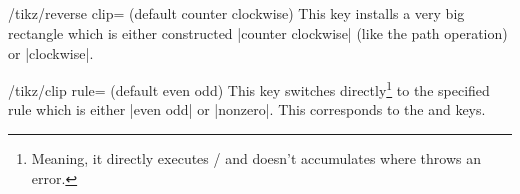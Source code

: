 \pagebreak
\subsection{\tikzname}
\begin{multicols}{2}
\begin{key}{/tikz/reverse clip= (default counter clockwise)}
This key installs a very big rectangle which is either constructed
|counter clockwise| (like the 
path operation) or |clockwise|.
\end{key}
\begin{key}{/tikz/clip rule= (default even odd)}
This key switches directly\footnote{%
  Meaning, it directly executes
  /%
  and doesn't accumulates where \tikzname\space
  throws an error.}
to the specified rule which is
either |even odd| or |nonzero|.
This corresponds to the  and
 keys.
\end{key}
\end{multicols}
\begin{codeexample}[preamble=\usetikzlibrary{ext.misc},width=6cm]
\newcommand*\myDiagram[1]{
  \fill[left color=blue, right color=green] (0, 0) rectangle (2, 1);
  \clip (1, .5) #1 [reverse clip];
  \fill[left color=green, right color=blue] (0, 0) rectangle (2, 1);
}
\end{codeexample}
\endinput